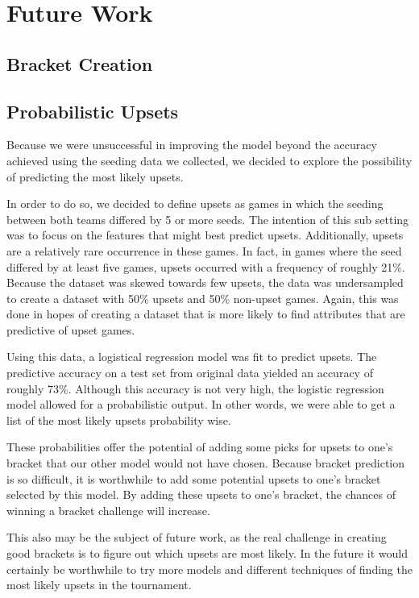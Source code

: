 \section{Future Work}
\subsection{Bracket Creation}


\subsection{Probabilistic Upsets}

Because we were unsuccessful in improving the model beyond the accuracy achieved using the seeding data we collected, we decided to explore the possibility of predicting the most likely upsets. 

In order to do so, we decided to define upsets as games in which the seeding between both teams differed by 5 or more seeds. 
The intention of this sub setting was to focus on the features that might best predict upsets. 
Additionally, upsets are a relatively rare occurrence in these games. 
In fact, in games where the seed differed by at least five games, upsets occurred with a frequency of roughly 21\%.
Because the dataset was skewed towards few upsets, the data was undersampled to create a dataset with 50\% upsets and 50\% non-upset games. 
Again, this was done in hopes of creating a dataset that is more likely to find attributes that are predictive of upset games. 

Using this data, a logistical regression model was fit to predict upsets. 
The predictive accuracy on a test set from original data yielded an accuracy of roughly 73\%. 
Although this accuracy is not very high, the logistic regression model allowed for a probabilistic output. 
In other words, we were able to get a list of the most likely upsets probability wise. 

These probabilities offer the potential of adding some picks for upsets to one’s bracket that our other model would not have chosen. 
Because bracket prediction is so difficult, it is worthwhile to add some potential upsets to one’s bracket selected by this model. 
By adding these upsets to one’s bracket, the chances of winning a bracket challenge will increase. 

This also may be the subject of future work, as the real challenge in creating good brackets is to figure out which upsets are most likely. 
In the future it would certainly be worthwhile to try more models and different techniques of finding the most likely upsets in the tournament.

